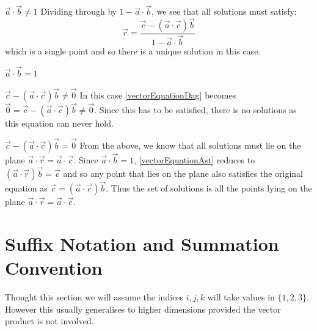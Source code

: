 \documentclass[../main.tex]{subfiles}
\begin{document}
\begin{proofcases}
  \begin{case}{$\vec{a} \cdot \vec{b} \neq 1$}
    Dividing through by $1 - \vec{a} \cdot \vec{b}$, we see that all solutions must satisfy:
    \[
      \vec{r} = \frac{\vec{c} - (\vec{a} \cdot \vec{c})\vec{b}}{1 - \vec{a} \cdot \vec{b}}
    \]
    which is a single point and so there is a unique solution in this case.
  \end{case}
  \begin{case}{$\vec{a} \cdot \vec{b} = 1$}
    \begin{proofcases}
      \begin{case}{$\vec{c} - (\vec{a} \cdot \vec{c})\vec{b} \neq \vec{0}$}
        In this case \cref{vectorEquationDag} becomes $\vec{0} = \vec{c} - (\vec{a} \cdot \vec{c})\vec{b} \neq \vec{0}$.
        Since this has to be satisfied, there is no solutions as this equation can never hold.
      \end{case}
      \begin{case}{$\vec{c} - (\vec{a} \cdot \vec{c})\vec{b} = \vec{0}$}
        From the above, we know that all solutions must lie on the plane $\vec{a} \cdot \vec{r} = \vec{a} \cdot \vec{c}$.
        Since $\vec{a} \cdot \vec{b} = 1$, \cref{vectorEquationAst} reduces to $(\vec{a} \cdot \vec{r}) \vec{b} = \vec{c}$ and so any point that lies on the plane also satisfies the original equation as $\vec{c} = (\vec{a} \cdot \vec{c})\vec{b}$.
        Thus the set of solutions is all the points lying on the plane $\vec{a} \cdot \vec{r} = \vec{a} \cdot \vec{c}$.
      \end{case}
    \end{proofcases}
  \end{case}
\end{proofcases}
\section{Suffix Notation and Summation Convention}
\begin{remark}[Note]
  Thought this section we will assume the indices $i, j, k$ will take values in $\{1, 2, 3\}$.
  However this usually generalises to higher dimensions provided the vector product is not involved.
\end{remark}
\end{document}
